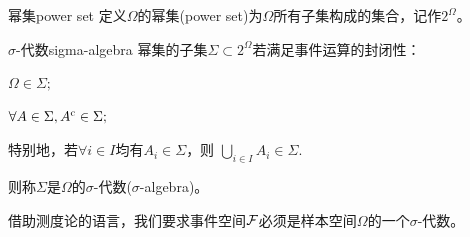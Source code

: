 \begin{definition}
	{幂集}{power set}
	定义$\Omega$的幂集(power set)为$\Omega$所有子集构成的集合，记作$2^\Omega$。
\end{definition}

\begin{definition}{$\sigma$-代数}{sigma-algebra}
	幂集的子集$\Sigma \subset 2^\Omega$若满足事件运算的封闭性：
	\begin{compactenum}
		\item $\Omega \in \Sigma;$
		\item $\forall A \in \Sigma, A^{\mathrm c} \in \Sigma;$
		\item 特别地，若$\forall i \in I$均有$A_i \in \Sigma$，则
		$\textstyle\bigcup_{i\in I} A_i \in \Sigma.$
	\end{compactenum}
	则称$\Sigma$是$\Omega$的$\sigma$-代数($\sigma$-algebra)。
\end{definition}

借助测度论的语言，我们要求事件空间$\mathcal F$必须是样本空间$\Omega$的一个$\sigma$-代数。

